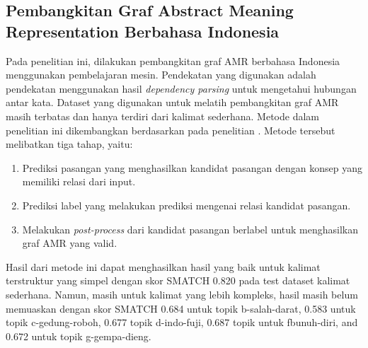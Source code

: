 \subsection{Pembangkitan Graf Abstract Meaning Representation Berbahasa Indonesia }

Pada penelitian ini, dilakukan pembangkitan graf AMR berbahasa Indonesia menggunakan pembelajaran mesin.
Pendekatan yang digunakan adalah pendekatan menggunakan hasil \textit{dependency parsing} untuk mengetahui hubungan antar kata.
Dataset yang digunakan untuk melatih pembangkitan graf AMR masih terbatas dan hanya terdiri dari kalimat sederhana.
Metode dalam penelitian ini dikembangkan berdasarkan pada penelitian \textcite{zhang2019}.
Metode tersebut melibatkan tiga tahap, yaitu:
\begin{enumerate}
  \item Prediksi pasangan yang menghasilkan kandidat pasangan dengan konsep yang memiliki relasi dari input.
  \item Prediksi label yang melakukan prediksi mengenai relasi kandidat pasangan.
  \item Melakukan \textit{post-process} dari kandidat pasangan berlabel untuk menghasilkan graf AMR yang valid.
\end{enumerate}

Hasil dari metode ini dapat menghasilkan hasil yang baik untuk kalimat terstruktur yang simpel dengan skor \gls{SMATCH} 0.820 pada test dataset kalimat sederhana.
Namun, masih untuk kalimat yang lebih kompleks, hasil masih belum memuaskan dengan skor \gls{SMATCH} 0.684 untuk topik b-salah-darat, 0.583 untuk topik c-gedung-roboh, 0.677 topik d-indo-fuji, 0.687 topik untuk fbunuh-diri, and 0.672 untuk topik g-gempa-dieng.

